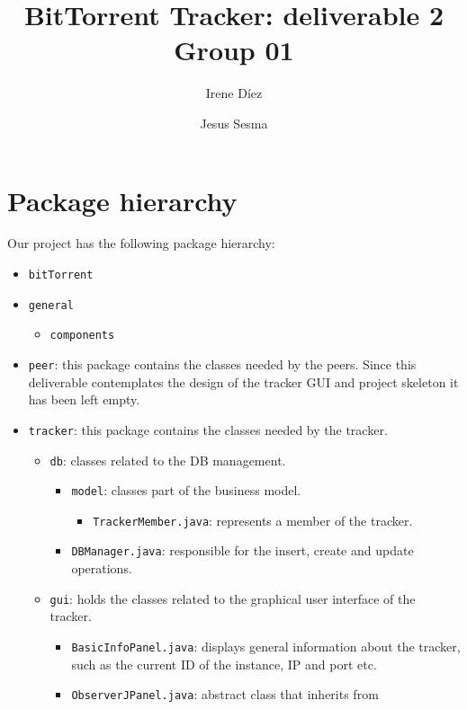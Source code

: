 \documentclass[twoside,a4paper,10pt]{article}
\title{BitTorrent Tracker: deliverable 2\\
  Group 01}
\author{Irene Díez \and Jesus Sesma}
\begin{document}
\date{}
\maketitle

\section{Package hierarchy}

Our project has the following package hierarchy:

\begin{itemize}
\item \texttt{bitTorrent}
\item \texttt{general}
  \begin{itemize}
  \item \texttt{components}
  \end{itemize}
\item \texttt{peer}: this package contains the classes needed by the peers. 
  Since this deliverable contemplates the design of the tracker GUI and
  project skeleton it has been left empty.
\item \texttt{tracker}: this package contains the classes needed by the tracker.
  \begin{itemize}
  \item \texttt{db}: classes related to the DB management.
    \begin{itemize}
    \item \texttt{model}: classes part of the business model.
      \begin{itemize}
      \item \texttt{TrackerMember.java}: represents a member of the tracker.
      \end{itemize}
    \item \texttt{DBManager.java}: responsible for the insert, create and
      update operations.
    \end{itemize}
  \item \texttt{gui}: holds the classes related to the graphical user interface
    of the tracker.
    \begin{itemize}
    \item \texttt{BasicInfoPanel.java}: displays general information about
      the tracker, such as the current ID of the instance, IP and port etc.
    \item \texttt{ObserverJPanel.java}: abstract class that inherits from

\end{itemize}
\end{itemize}
\end{itemize}
\end{document}
